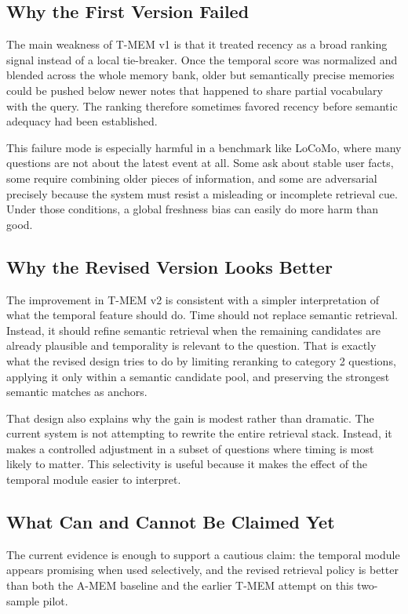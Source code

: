 \documentclass[conference]{IEEEtran}
\begin{document}
\subsection{Why the First Version Failed}

The main weakness of T-MEM v1 is that it treated recency as a broad ranking signal instead of a local tie-breaker. Once the temporal score was normalized and blended across the whole memory bank, older but semantically precise memories could be pushed below newer notes that happened to share partial vocabulary with the query. The ranking therefore sometimes favored recency before semantic adequacy had been established.

This failure mode is especially harmful in a benchmark like LoCoMo, where many questions are not about the latest event at all. Some ask about stable user facts, some require combining older pieces of information, and some are adversarial precisely because the system must resist a misleading or incomplete retrieval cue. Under those conditions, a global freshness bias can easily do more harm than good.

\subsection{Why the Revised Version Looks Better}

The improvement in T-MEM v2 is consistent with a simpler interpretation of what the temporal feature should do. Time should not replace semantic retrieval. Instead, it should refine semantic retrieval when the remaining candidates are already plausible and temporality is relevant to the question. That is exactly what the revised design tries to do by limiting reranking to category 2 questions, applying it only within a semantic candidate pool, and preserving the strongest semantic matches as anchors.

That design also explains why the gain is modest rather than dramatic. The current system is not attempting to rewrite the entire retrieval stack. Instead, it makes a controlled adjustment in a subset of questions where timing is most likely to matter. This selectivity is useful because it makes the effect of the temporal module easier to interpret.

\subsection{What Can and Cannot Be Claimed Yet}

The current evidence is enough to support a cautious claim: the temporal module appears promising when used selectively, and the revised retrieval policy is better than both the A-MEM baseline and the earlier T-MEM attempt on this two-sample pilot.
\end{document}
